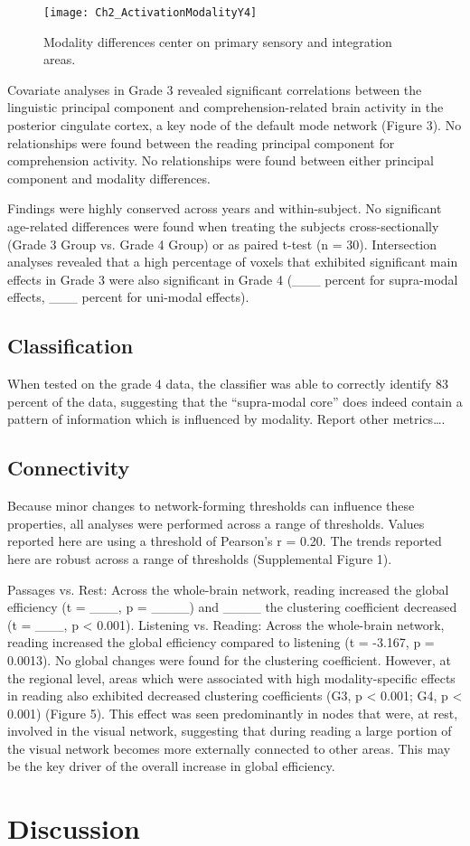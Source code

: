 \begin{figure}[!b]
\centering
\texttt{[image: Ch2\_ActivationModalityY4]}
    \caption[Modality differences center on primary sensory and integration areas.]{Modality differences center on primary sensory and integration areas.}
\label{fig:ch2_modality}
\end{figure}

Covariate analyses in Grade 3 revealed significant correlations between the linguistic principal component and comprehension-related brain activity in the posterior cingulate cortex, a key node of the default mode network (Figure 3). No relationships were found between the reading principal component for comprehension activity. No relationships were found between either principal component and modality differences.

Findings were highly conserved across years and within-subject. No significant age-related differences were found when treating the subjects cross-sectionally (Grade 3 Group vs. Grade 4 Group) or as paired t-test (n = 30). Intersection analyses revealed that a high percentage of voxels that exhibited significant main effects in Grade 3 were also significant in Grade 4 (___ percent for supra-modal effects, ___ percent for uni-modal effects).

\subsection{Classification}
When tested on the grade 4 data, the classifier was able to correctly identify 83 percent of the data, suggesting that the “supra-modal core” does indeed contain a pattern of information which is influenced by modality. Report other metrics….

\subsection{Connectivity}
Because minor changes to network-forming thresholds can influence these properties, all analyses were performed across a range of thresholds. Values reported here are using a threshold of Pearson’s r = 0.20. The trends reported here are robust across a range of thresholds (Supplemental Figure 1). 

Passages vs. Rest: Across the whole-brain network, reading increased the global efficiency (t = ___, p = ____) and ____ the clustering coefficient decreased (t = ___, p < 0.001).
Listening vs. Reading: Across the whole-brain network, reading increased the global efficiency compared to listening (t = -3.167, p = 0.0013). No global changes were found for the clustering coefficient. However, at the regional level, areas which were associated with high modality-specific effects in reading also exhibited decreased clustering coefficients (G3, p < 0.001; G4, p < 0.001) (Figure 5). This effect was seen predominantly in nodes that were, at rest, involved in the visual network, suggesting that during reading a large portion of the visual network becomes more externally connected to other areas. This may be the key driver of the overall increase in global efficiency.


\section{Discussion}